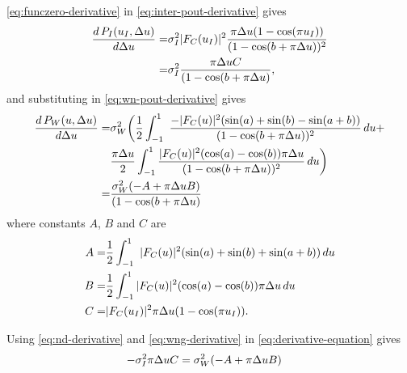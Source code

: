 \eqref{eq:funczero-derivative} in \eqref{eq:inter-pout-derivative}
gives
\begin{align} 
\label{eq:nd-derivative}
\frac{d\,P_I(u_I, \Delta u)}{d\Delta u} =& \sigma_I^2 |F_C(u_I)|^2 \frac{\pi\Delta u(1 - \cos(\pi u_I))}{(1 - \cos(b + \pi\Delta u))^2} \nonumber \\
=& \sigma_I^2\frac{\pi\Delta u C}{(1 - \cos(b + \pi\Delta u)},
\end{align}
and substituting in \eqref{eq:wn-pout-derivative} gives
\begin{align} 
\label{eq:wng-derivative}
\frac{d\,P_W(u, \Delta u) }{d\Delta u} =& \sigma^2_W \biggl(\frac{1}{2}\int_{-1}^{1} \
\frac{-|F_C(u)|^2(\sin(a) + \sin(b) - \sin(a+b))}{(1 - \cos(b + \pi\Delta u))^2}\, du + \nonumber\\
& \frac{\pi\Delta u}{2}\int_{-1}^{1} \frac{|F_C(u)|^2(\cos(a)-\cos(b))\pi\Delta u}{(1 - \cos(b + \pi\Delta u))^2} \, du \biggr)  \nonumber \\
=& \frac{\sigma^2_W(-A + \pi\Delta u B)}{(1 - \cos(b + \pi\Delta u)}
\end{align}
where constants $A$, $B$ and $C$ are
\begin{align*}
  A =& \frac{1}{2}\int_{-1}^{1} \
     |F_C(u)|^2(\sin(a) + \sin(b) + \sin(a+b))\, du \\
  B =& \frac{1}{2}\int_{-1}^{1} |F_C(u)|^2(\cos(a)-\cos(b))\pi\Delta u \, du \\
  C =& |F_C(u_I)|^2\pi\Delta u(1 - \cos(\pi u_I)).
\end{align*}

Using \eqref{eq:nd-derivative} and \eqref{eq:wng-derivative} in \eqref{eq:derivative-equation} gives
\begin{align}
  \label{eq:1}
  -\sigma_I^2 \pi\Delta u C &=  \sigma^2_W (-A + \pi\Delta u B)
\end{align}

